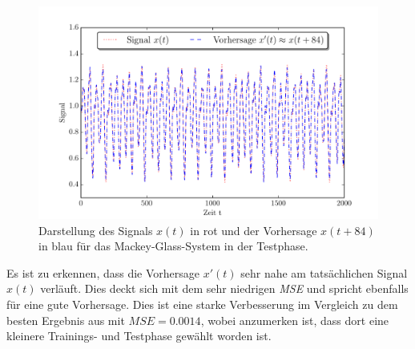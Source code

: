\begin{figure}[H]
    \centering
    \includegraphics[width = 0.9 \textwidth]{figures/mackeyglass_pred.pdf}
    \caption{Darstellung des Signals $x(t)$ in rot und der Vorhersage $x(t+84)$ in blau für das Mackey-Glass-System in der Testphase.}
    \label{fig:application_mackeyglass}
\end{figure}

Es ist zu erkennen, dass die Vorhersage $x'(t)$ sehr nahe am tatsächlichen Signal $x(t)$ verläuft. Dies deckt sich mit dem sehr niedrigen \textit{MSE} und spricht ebenfalls für eine gute Vorhersage. Dies ist eine starke Verbesserung im Vergleich zu dem besten Ergebnis aus \citep{caraballo2014} mit $MSE = 0.0014$, wobei anzumerken ist, dass dort eine kleinere Trainings- und Testphase gewählt worden ist.